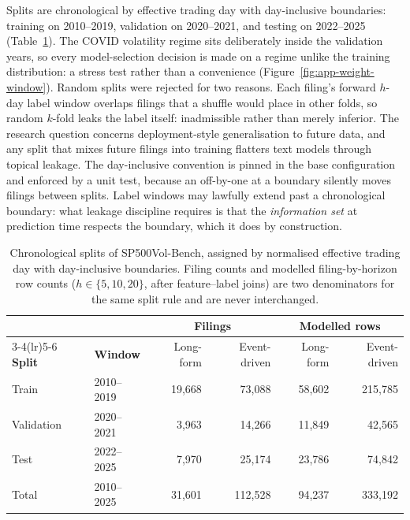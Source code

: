 Splits are chronological by effective trading day with day-inclusive boundaries: training on 2010--2019, validation on 2020--2021, and testing on 2022--2025 (Table~\ref{tab:data-splits}). %
The COVID volatility regime sits deliberately inside the validation years, so every model-selection decision is made on a regime unlike the training distribution: a stress test rather than a convenience (Figure~\ref{fig:app-weight-window}). Random splits were rejected for two reasons. Each filing's forward $h$-day label window overlaps filings that a shuffle would place in other folds, so random $k$-fold leaks the label itself: inadmissible rather than merely inferior. The research question concerns deployment-style generalisation to future data, and any split that mixes future filings into training flatters text models through topical leakage. The day-inclusive convention is pinned in the base configuration and enforced by a unit test, because an off-by-one at a boundary silently moves filings between splits. Label windows may lawfully extend past a chronological boundary: what leakage discipline requires is that the \emph{information set} at prediction time respects the boundary, which it does by construction.

\begin{table}[t]
\centering
\caption[Chronological splits of SP500Vol-Bench]{Chronological splits of SP500Vol-Bench, assigned by normalised effective trading day with day-inclusive boundaries. Filing counts and modelled filing-by-horizon row counts ($h\in\{5,10,20\}$, after feature--label joins) are two denominators for the same split rule and are never interchanged.}
\label{tab:data-splits}
\begin{tabular}{llrrrr}
\toprule
 & & \multicolumn{2}{c}{\textbf{Filings}} & \multicolumn{2}{c}{\textbf{Modelled rows}} \\
\cmidrule(lr){3-4}\cmidrule(lr){5-6}
\textbf{Split} & \textbf{Window} & Long-form & Event-driven & Long-form & Event-driven \\
\midrule
Train      & 2010--2019 & 19{,}668 & 73{,}088  & 58{,}602 & 215{,}785 \\ %
Validation & 2020--2021 & 3{,}963  & 14{,}266  & 11{,}849 & 42{,}565  \\ %
Test       & 2022--2025 & 7{,}970  & 25{,}174  & 23{,}786 & 74{,}842  \\ %
\midrule
Total      & 2010--2025 & 31{,}601 & 112{,}528 & 94{,}237 & 333{,}192 \\ %
\bottomrule
\end{tabular}
\end{table}

